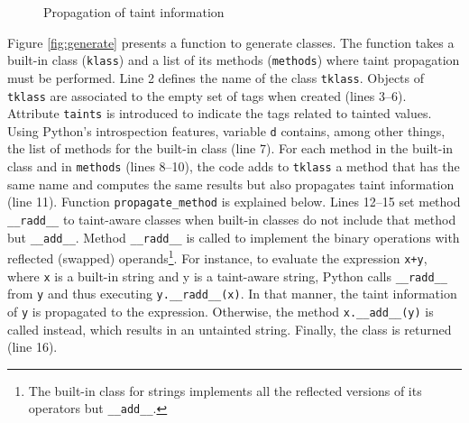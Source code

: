 \begin{wrapfigure}{r}{7.5cm}
\vspace{-30pt}
{\small{

\caption{\label{fig:propagate} Propagation of taint information}
}}
\vspace{-15pt}
\end{wrapfigure}
Figure \ref{fig:generate} presents a function to generate
\nametklass classes. The function takes a built-in
class (\texttt{klass}) and a list of its methods
(\texttt{methods}) where taint propagation 
must be performed. 
Line 2 defines the name of the \nametklass class \texttt{tklass}.
Objects of \texttt{tklass}  
are associated to the empty set
 of tags when created (lines 3--6). Attribute 
\texttt{taints} is introduced to 
indicate the tags related to tainted values.
Using Python's introspection features, variable 
\texttt{d} contains, among other
things, the list of methods for the built-in class (line 7). 
For each method in the built-in class and in \texttt{methods} 
(lines 8--10), the code adds to \texttt{tklass} a 
method that has the same name and computes the same results 
but also propagates taint information  
(line 11).
Function \texttt{propagate\_method} is explained below.
Lines 12--15 set method \texttt{\_\_radd\_\_} to taint-aware 
classes when built-in classes do not include that method but 
\texttt{\_\_add\_\_}.
Method \texttt{\_\_radd\_\_} is called to implement the binary operations 
with reflected (swapped) operands\footnote{The built-in class 
   for strings implements all 
   the reflected versions of its operators but \texttt{\_\_add\_\_}.}. 
For instance, to evaluate the expression \texttt{x+y}, where \texttt{x} is a built-in string 
and y is a taint-aware string, Python calls \texttt{\_\_radd\_\_} from 
\texttt{y} and thus executing \texttt{y.\_\_radd\_\_(x)}. In that manner, 
the taint information of \texttt{y} is propagated to the expression. Otherwise, the method
\texttt{x.\_\_add\_\_(y)} is called instead, 
which results in an untainted string.
Finally, the \nametklass class is returned (line 16). 

